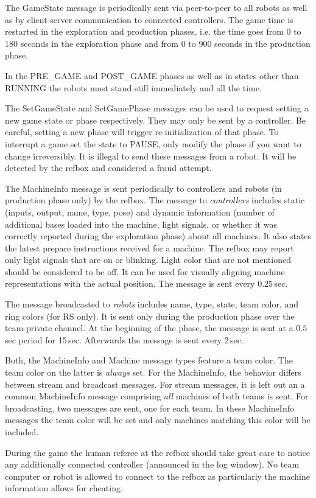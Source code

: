 \documentclass[a4paper]{article}
\begin{document}
%
{%
  The GameState message is periodically sent via peer-to-peer to all
  robots as well as by client-server communication to connected
  controllers. The game time is restarted in the exploration and
  production phases, i.e. the time goes from 0 to 180 seconds in the
  exploration phase and from 0 to 900 seconds in the production phase.

  \medskip

  In the PRE\_GAME and POST\_GAME phases as well as in states other
  than RUNNING the robots must stand still immediately and all the
  time.

  \medskip

  The SetGameState and SetGamePhase messages can be used to request
  setting a new game state or phase respectively. They may only be
  sent by a controller. Be careful, setting a new phase will trigger
  re-initialization of that phase. To interrupt a game set the state
  to PAUSE, only modify the phase if you want to change
  irreversibly. It is illegal to send these messages from a robot. It
  will be detected by the refbox and considered a fraud attempt.
}

%
{%
  The MachineInfo message is sent periodically to controllers and
  robots (in production phase only) by the refbox. The message to
  \emph{controllers} includes static (inputs, output, name, type,
  pose) and dynamic information (number of additional bases loaded
  into the machine, light signals, or whether it was correctly
  reported during the exploration phase) about all machines. It also
  states the latest prepare instructions received for a machine. The
  refbox may report only light signals that are on or blinking. Light
  color that are not mentioned should be considered to be off. It can
  be used for visually aligning machine representations with the
  actual position. The message is sent every $0.25$\,sec.

  The message broadcasted to \emph{robots} includes name, type, state,
  team color, and ring colors (for RS only). It is sent only during
  the production phase over the team-private channel. At the beginning
  of the phase, the message is sent at a $0.5$\,sec period for
  15\,sec. Afterwards the message is sent every 2\,sec.
 
  \medskip
  Both, the MachineInfo and Machine message types feature a team
  color. The team color on the latter is \emph{always} set. For the
  MachineInfo, the behavior differs between stream and broadcast
  messages. For stream messages, it is left out an a common
  MachineInfo message comprising \emph{all} machines of both teams is
  sent. For broadcasting, two messages are sent, one for each team. In
  these MachineInfo messages the team color will be set and only
  machines matching this color will be included.

  \medskip

  During the game the human referee at the refbox should take great
  care to notice any additionally connected controller (announced in
  the log window). No team computer or robot is allowed to connect to
  the refbox as particularly the machine information allows for
  cheating.
}
\end{document}
